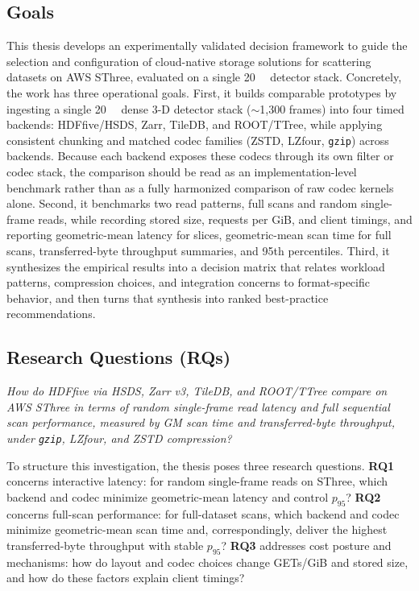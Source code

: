 \documentclass[nomenclature, english, bibtex]{kththesis}
\numberwithin{listing}{chapter}
\begin{document}
\subsection{Goals}
This thesis develops an experimentally validated decision framework to guide the selection and configuration of cloud-native storage solutions for scattering datasets on \gls{AWS} \gls{SThree}, evaluated on a single \SI{20}{\gibi\byte} detector stack. Concretely, the work has three operational goals. First, it builds comparable prototypes by ingesting a single \SI{20}{\gibi\byte} dense 3-D detector stack (\(\sim\)1{,}300 frames) into four timed backends: \gls{HDFfive}/\gls{HSDS}, Zarr, TileDB, and \gls{ROOT}/\gls{TTree}, while applying consistent chunking and matched codec families (\gls{ZSTD}, \gls{LZfour}, \texttt{gzip}) across backends. Because each backend exposes these codecs through its own filter or codec stack, the comparison should be read as an implementation-level benchmark rather than as a fully harmonized comparison of raw codec kernels alone. Second, it benchmarks two read patterns, full scans and random single-frame reads, while recording stored size, requests per GiB, and client timings, and reporting geometric-mean latency for slices, geometric-mean scan time for full scans, transferred-byte throughput summaries, and 95th percentiles. Third, it synthesizes the empirical results into a decision matrix that relates workload patterns, compression choices, and integration concerns to format-specific behavior, and then turns that synthesis into ranked best-practice recommendations.

\subsection{Research Questions (RQs)}
\emph{How do \gls{HDFfive} via \gls{HSDS}, Zarr v3, TileDB, and \gls{ROOT}/\gls{TTree} compare on \gls{AWS} \gls{SThree} in terms of random single-frame read latency and full sequential scan performance, measured by \gls{GM} scan time and transferred-byte throughput, under \texttt{gzip}, \gls{LZfour}, and \gls{ZSTD} compression?}

To structure this investigation, the thesis poses three research questions. \textbf{RQ1} concerns interactive latency: for random single-frame reads on \gls{SThree}, which backend and codec minimize geometric-mean latency and control $p_{95}$? \textbf{RQ2} concerns full-scan performance: for full-dataset scans, which backend and codec minimize geometric-mean scan time and, correspondingly, deliver the highest transferred-byte throughput with stable $p_{95}$? \textbf{RQ3} addresses cost posture and mechanisms: how do layout and codec choices change GETs/GiB and stored size, and how do these factors explain client timings?
\end{document}
